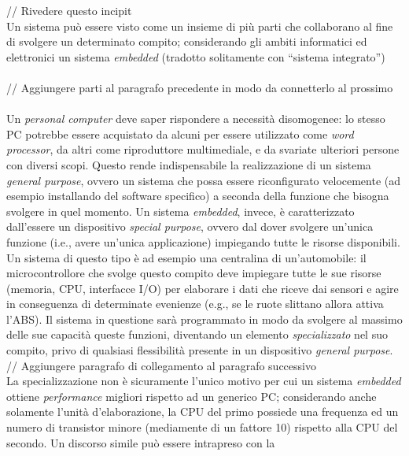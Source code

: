 // Rivedere questo incipit \\
Un sistema può essere visto come un insieme di più parti che collaborano al fine
di svolgere un determinato compito; considerando gli  ambiti informatici ed 
elettronici un sistema \emph{embedded} (tradotto solitamente con ``sistema 
integrato'')
 \\ \\
// Aggiungere parti al paragrafo precedente in modo da connetterlo al prossimo
 \\ \\
Un \emph{personal computer} deve saper rispondere a necessità disomogenee: 
lo stesso PC potrebbe essere acquistato da alcuni per essere utilizzato come 
\emph{word processor}, da altri come riproduttore multimediale, e da svariate 
ulteriori persone con diversi scopi. Questo rende indispensabile la 
realizzazione di un sistema \emph{general purpose}, ovvero un sistema che possa 
essere riconfigurato velocemente (ad esempio installando del software 
specifico) a seconda della funzione che bisogna svolgere in quel momento.
Un sistema \emph{embedded}, invece, è caratterizzato dall'essere un dispositivo 
\emph{special purpose}, ovvero dal dover svolgere un'unica funzione (i.e., 
avere un'unica applicazione) impiegando tutte le risorse disponibili.
Un sistema di questo tipo è ad esempio una centralina di un'automobile: il 
microcontrollore che svolge questo compito deve impiegare tutte le sue risorse 
(memoria, CPU, interfacce I/O) per elaborare i dati che riceve dai sensori e 
agire in conseguenza di determinate evenienze (e.g., se le ruote slittano 
allora attiva l'ABS). Il sistema in questione sarà programmato in modo da 
svolgere al massimo delle sue capacità queste funzioni, diventando un elemento 
\emph{specializzato} nel suo compito, privo di qualsiasi flessibilità presente 
in un dispositivo \emph{general purpose}.
\\ // Aggiungere paragrafo di collegamento al paragrafo successivo \\
La specializzazione non è sicuramente l'unico motivo per cui un sistema 
\emph{embedded} ottiene \emph{performance} migliori rispetto ad un generico PC; 
considerando anche solamente l'unità d'elaborazione, la CPU del primo possiede 
una frequenza ed un numero di transistor minore (mediamente di un fattore 10) 
rispetto alla CPU del secondo. Un discorso simile può essere intrapreso con la 
